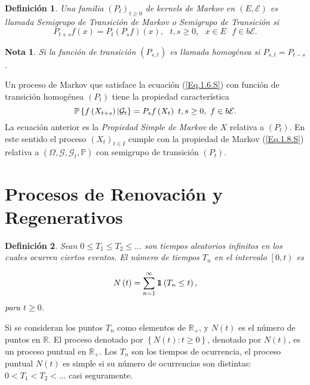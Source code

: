 \documentclass{article}
\newtheorem{Def}{Definición}[section]
\newtheorem{Note}{Nota}[section]
\newcommand{\rea}{\mathbb{R}}
\newcommand{\prob}{\mathbb{P}}
\newcommand{\indora}{\mbox{$1$\hspace{-0.8ex}$1$}}
\newcommand{\ER}{\left(E,\mathcal{E}\right)}
\newcommand{\KM}{\left(P_{s,t}\right)}
\newcommand{\PE}{\left(X_{t}\right)_{t\in I}}
\numberwithin{equation}{section}
\begin{document}
\begin{Def}
Una familia $\left(P_{t}\right)_{t\geq0}$ de kernels de Markov en $\ER$ es llamada {\em Semigrupo de Transici\'on de Markov} o {\em Semigrupo de Transici\'on} si
\[P_{t+s}f\left(x\right)=P_{t}\left(P_{s}f\right)\left(x\right),\textrm{ }t,s\geq0,\textrm{ }x\in E\textrm{ }f\in b\mathcal{E}.\]
\end{Def}
\begin{Note}
Si la funci\'on de transici\'on $\KM$ es llamada homog\'enea si $P_{s,t}=P_{t-s}$.
\end{Note}

Un proceso de Markov que satisface la ecuaci\'on (\ref{Eq.1.6.S}) con funci\'on de transici\'on homog\'enea $\left(P_{t}\right)$ tiene la propiedad caracter\'istica
\begin{equation}\label{Eq.1.8.S}\index{Propiedad Simple de Markov}
\prob\left\{f\left(X_{t+s}\right)|\mathcal{G}_{t}\right\}=P_{s}f\left(X_{t}\right)\textrm{ }t,s\geq0,\textrm{ }f\in b\mathcal{E}.
\end{equation}
La ecuaci\'on anterior es la {\em Propiedad Simple de Markov} de $X$ relativa a $\left(P_{t}\right)$. En este sentido el proceso $\PE$ cumple con la propiedad de Markov (\ref{Eq.1.8.S}) relativa a $\left(\Omega,\mathcal{G},\mathcal{G}_{t},\prob\right)$ con semigrupo de transici\'on $\left(P_{t}\right)$.

\section{Procesos de Renovaci\'on y Regenerativos}

\begin{Def}\label{Def.Tn}
Sean $0\leq T_{1}\leq T_{2}\leq \ldots$ son tiempos aleatorios infinitos en los cuales ocurren ciertos eventos. El n\'umero de tiempos $T_{n}$ en el intervalo $\left[0,t\right)$ es

\begin{eqnarray}
N\left(t\right)=\sum_{n=1}^{\infty}\indora\left(T_{n}\leq t\right),
\end{eqnarray}
para $t\geq0$.
\end{Def}

Si se consideran los puntos $T_{n}$ como elementos de $\rea_{+}$, y $N\left(t\right)$ es el n\'umero de puntos en $\rea$. El proceso denotado por $\left\{N\left(t\right):t\geq0\right\}$, denotado por $N\left(t\right)$, es un proceso puntual en $\rea_{+}$. Los $T_{n}$ son los tiempos de ocurrencia, el proceso puntual $N\left(t\right)$ es simple si su n\'umero de ocurrencias son distintas: $0<T_{1}<T_{2}<\ldots$ casi seguramente.
\end{document}
